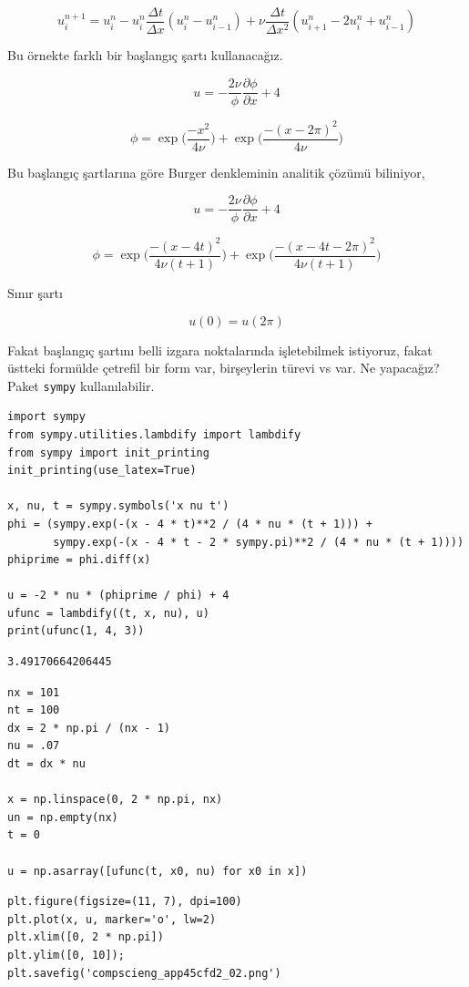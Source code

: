 \documentclass[12pt,fleqn]{article}\usepackage{../../common}
\begin{document}
$$
u_i^{n+1} =
u_i^n - u_i^n \frac{\Delta t}{\Delta x} (u_i^n - u_{i-1}^n) +
\nu \frac{\Delta t}{\Delta x^2}(u_{i+1}^n - 2u_i^n + u_{i-1}^n)
$$

Bu örnekte farklı bir başlangıç şartı kullanacağız.

$$
u = -\frac{2 \nu}{\phi} \frac{\partial \phi}{\partial x} + 4 
$$

$$
\phi = \exp \bigg(\frac{-x^2}{4 \nu} \bigg) + \exp \bigg(\frac{-(x-2 \pi)^2}{4 \nu} \bigg)
$$

Bu başlangıç şartlarına göre Burger denkleminin analitik çözümü biliniyor,

$$
u = -\frac{2 \nu}{\phi} \frac{\partial \phi}{\partial x} + 4
$$

$$
\phi = \exp \bigg(\frac{-(x-4t)^2}{4 \nu (t+1)} \bigg) + \exp \bigg(\frac{-(x-4t -2 \pi)^2}{4 \nu(t+1)} \bigg)
$$

Sınır şartı

$$
u(0) = u(2\pi)
$$

Fakat başlangıç şartını belli izgara noktalarında işletebilmek istiyoruz, fakat
üstteki formülde çetrefil bir form var, birşeylerin türevi vs var. Ne yapacağız? 
Paket \verb!sympy! kullanılabilir.

\begin{verbatim}
import sympy
from sympy.utilities.lambdify import lambdify
from sympy import init_printing
init_printing(use_latex=True)

x, nu, t = sympy.symbols('x nu t')
phi = (sympy.exp(-(x - 4 * t)**2 / (4 * nu * (t + 1))) +
       sympy.exp(-(x - 4 * t - 2 * sympy.pi)**2 / (4 * nu * (t + 1))))
phiprime = phi.diff(x)

u = -2 * nu * (phiprime / phi) + 4
ufunc = lambdify((t, x, nu), u)
print(ufunc(1, 4, 3))
\end{verbatim}

\begin{verbatim}
3.49170664206445
\end{verbatim}


\begin{verbatim}
nx = 101
nt = 100
dx = 2 * np.pi / (nx - 1)
nu = .07
dt = dx * nu

x = np.linspace(0, 2 * np.pi, nx)
un = np.empty(nx)
t = 0

u = np.asarray([ufunc(t, x0, nu) for x0 in x])
\end{verbatim}

\begin{verbatim}
plt.figure(figsize=(11, 7), dpi=100)
plt.plot(x, u, marker='o', lw=2)
plt.xlim([0, 2 * np.pi])
plt.ylim([0, 10]);
plt.savefig('compscieng_app45cfd2_02.png')
\end{verbatim}
\end{document}
